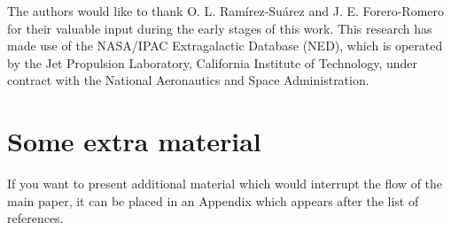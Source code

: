 \documentclass[a4paper,fleqn,usenatbib]{mnras}
\begin{document}
The authors would like to thank O. L. Ram\'irez-Su\'arez and J. E. Forero-Romero for their valuable input during the early stages of this work. This research has made use of the NASA/IPAC Extragalactic Database (NED), which is operated by the Jet Propulsion Laboratory, California Institute of Technology, under contract with the National Aeronautics and Space Administration.










\appendix

\section{Some extra material}

If you want to present additional material which would interrupt the flow of the main paper,
it can be placed in an Appendix which appears after the list of references.



\bsp	%
\label{lastpage}
\end{document}
